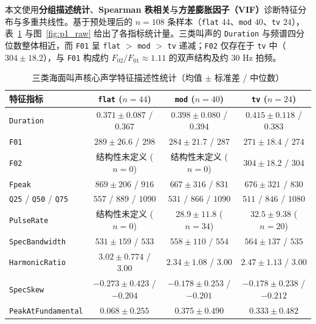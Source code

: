\documentclass{apmcmthesis}
\begin{document}
本文使用\textbf{分组描述统计}、\textbf{Spearman 秩相关}与\textbf{方差膨胀因子（VIF）}诊断特征分布与多重共线性。基于预处理后的 $n = 108$ 条样本（\texttt{flat} $44$、\texttt{mod} $40$、\texttt{tv} $24$），表~\ref{tab:p1_descriptive} 与图~\ref{fig:p1_raw} 给出了各指标统计量。三类叫声的 \texttt{Duration} 与频谱四分位数整体相近，而 \texttt{F01} 呈 \texttt{flat} $>$ \texttt{mod} $>$ \texttt{tv} 递减；\texttt{F02} 仅存在于 \texttt{tv} 中（$304 \pm 18.2$），与 \texttt{F01} 构成约 $F_{02}/F_{01} \approx 1.11$ 的双声结构及约 $30\text{ Hz}$ 拍频。

\begin{table}[htbp]
\centering
\caption{三类海面叫声核心声学特征描述性统计（均值 $\pm$ 标准差 / 中位数）}
\label{tab:p1_descriptive}
\footnotesize\setlength{\tabcolsep}{4pt}
\begin{tabular*}{\linewidth}{@{\extracolsep{\fill}}lccc@{}}
\toprule
特征指标 & \texttt{flat} ($n=44$) & \texttt{mod} ($n=40$) & \texttt{tv} ($n=24$) \\
\midrule
\texttt{Duration} & $0.371 \pm 0.087$ / $0.367$ & $0.398 \pm 0.080$ / $0.394$ & $0.415 \pm 0.118$ / $0.383$ \\
\texttt{F01} & $289 \pm 26.6$ / $298$ & $284 \pm 21.7$ / $287$ & $271 \pm 18.4$ / $274$ \\
\texttt{F02} & 结构性未定义 ($n=0$) & 结构性未定义 ($n=0$) & $304 \pm 18.2$ / $304$ \\
\texttt{Fpeak} & $869 \pm 206$ / $916$ & $667 \pm 316$ / $831$ & $676 \pm 321$ / $830$ \\
\texttt{Q25} / \texttt{Q50} / \texttt{Q75} & $557$ / $889$ / $1090$ & $531$ / $866$ / $1090$ & $511$ / $846$ / $1080$ \\
\texttt{PulseRate} & 结构性未定义 ($n=0$) & $28.9 \pm 11.8$ ($n=34$) & $32.5 \pm 9.38$ ($n=20$) \\
\texttt{SpecBandwidth} & $531 \pm 159$ / $533$ & $558 \pm 110$ / $554$ & $564 \pm 137$ / $535$ \\
\texttt{HarmonicRatio} & $3.02 \pm 0.774$ / $3.00$ & $2.34 \pm 1.08$ / $3.00$ & $2.47 \pm 1.13$ / $3.00$ \\
\texttt{SpecSkew} & $-0.273 \pm 0.423$ / $-0.204$ & $-0.178 \pm 0.253$ / $-0.201$ & $-0.178 \pm 0.238$ / $-0.212$ \\
\texttt{PeakAtFundamental} & $0.068 \pm 0.255$ & $0.375 \pm 0.490$ & $0.333 \pm 0.482$ \\
\bottomrule
\end{tabular*}
\end{table}
\end{document}
